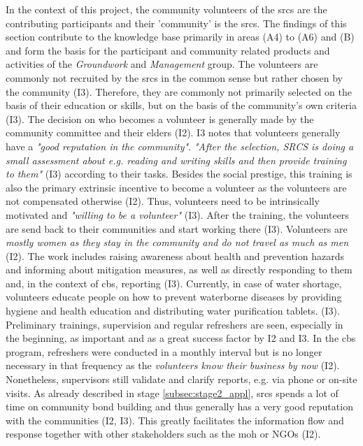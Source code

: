 In the context of this project, the community volunteers of the \acrshort{srcs} are the contributing participants and their 'community' is the \acrshort{srcs}. The findings of this section contribute to the knowledge base primarily in areas (A4) to (A6) and (B) and form the basis for the participant and community related products and activities of the \textit{Groundwork} and \textit{Management} group. The volunteers are commonly not recruited by the \acrshort{srcs} in the common sense but rather chosen by the community (I3). Therefore, they are commonly not primarily selected on the basis of their education or skills, but on the basis of the community's own criteria (I3). The decision on who becomes a volunteer is generally made by the community committee and their elders (I2). I3 notes that volunteers generally have a \textit{"good reputation in the community"}. \textit{"After the selection, SRCS is doing a small assessment about e.g. reading and writing skills and then provide training to them"} (I3) according to their tasks. Besides the social prestige, this training is also the primary extrinsic incentive to become a volunteer as the volunteers are not compensated otherwise (I2). Thus, volunteers need to be intrinsically motivated and \textit{"willing to be a volunteer"} (I3). After the training, the volunteers are send back to their communities and start working there (I3). Volunteers are \textit{mostly women as they stay in the community and do not travel as much as men} (I2). The work includes raising awareness about health and prevention hazards and informing about mitigation measures, as well as directly responding to them and, in the context of \acrshort{cbs}, reporting (I3). Currently, in case of water shortage,  volunteers educate people on how to prevent waterborne diseases by providing hygiene and health education and distributing water purification tablets. (I3).\newline
Preliminary trainings, supervision and regular refreshers are seen, especially in the beginning, as important and as a great success factor by I2 and I3. In the \acrshort{cbs} program, refreshers were conducted in a monthly interval but  is no longer necessary in that frequency as the \textit{volunteers know their business by now} (I2). Nonetheless, supervisors still validate and clarify reports, e.g. via phone or on-site visits. As already described in stage \ref*{subsec:stage2_appl}, \acrshort{srcs} spends a lot of time on community bond building and thus generally has a very good reputation with the communities (I2, I3). This greatly facilitates the information flow and response together with other stakeholders such as the \acrshort{moh} or NGOs (I2). 

